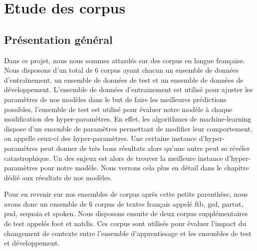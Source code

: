 \documentclass[french, 14pt]{memoir}
\begin{document}
\chapter{Etude des corpus}
\section{Présentation général}
Dans ce projet, nous nous sommes attardés sur des corpus en langue française. Nous disposons d'un total de 6 corpus ayant chacun un ensemble de données d'entraînement, un ensemble de données de test et un ensemble de données de développement. L'ensemble de données d'entrainement est utilisé pour ajuster les paramètres de nos modèles dans le but de faire les meilleures prédictions possibles, l'ensemble de test est utilisé pour évaluer notre modèle à chaque modification des hyper-paramètres. En effet, les algorithmes de machine-learning dispose d'un ensemble de paramètres permettant de modifier leur comportement, on appelle ceux-ci des hyper-paramètres. Une certaine instance d'hyper-paramètres peut donner de très bons résultats alors qu'une autre peut se révéler catastrophique.
Un des enjeux est alors de trouver la meilleure instance d'hyper-paramètres pour notre modèle. Nous verrons cela plus en détail dans le chapitre dédié aux résultats de nos modèles.

Pour en revenir sur nos ensembles de corpus après cette petite parenthèse, nous avons donc un ensemble de 6 corpus de textes français appelé ftb, gsd, partut, pud, sequoia et spoken. Nous disposons ensuite de deux corpus supplémentaires de test appelés foot et natdis. Ces corpus sont utilisés pour évaluer l'impact du changement de contexte entre l'ensemble d'apprentissage et les ensembles de test et développement.
\end{document}
